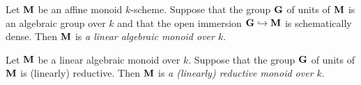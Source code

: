 \begin{definition}
Let $\mathbf{M}$ be an affine monoid $k$-scheme. Suppose that the group $\mathbf{G}$ of units of $\mathbf{M}$ is an algebraic group over $k$ and that the open immersion $\mathbf{G}\hookrightarrow \mathbf{M}$ is schematically dense. Then $\mathbf{M}$ is \textit{a linear algebraic monoid over $k$}.
\end{definition}

\begin{definition}
Let $\mathbf{M}$ be a linear algebraic monoid over $k$. Suppose that the group $\mathbf{G}$ of units of $\mathbf{M}$ is (linearly) reductive. Then $\mathbf{M}$ is \textit{a (linearly) reductive monoid over $k$}.
\end{definition}







\small





